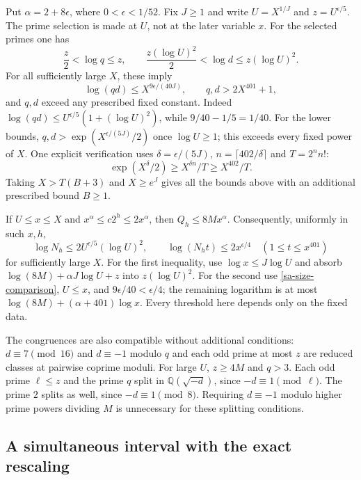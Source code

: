 Put $\alpha=2+8\epsilon$, where $0<\epsilon<1/52$.
Fix $J\ge1$ and write $U=X^{1/J}$ and $z=U^{\epsilon/5}$.
The prime selection is made at $U$, not at the later variable $x$.
For the selected primes one has
\begin{equation}\label{sa-prime-ranges}
 \frac z2<\log q\le z,\qquad
 \frac{z(\log U)^2}{2}<\log d\le z(\log U)^2.
\end{equation}
For all sufficiently large $X$, these imply
\begin{equation}\label{sa-size-comparison}
 \log(qd)\le X^{9\epsilon/(40J)},\qquad
 q,d>2X^{401}+1,
\end{equation}
and $q,d$ exceed any prescribed fixed constant.
Indeed $\log(qd)\le U^{\epsilon/5}(1+(\log U)^2)$, while
$9/40-1/5=1/40$. For the lower bounds,
$q,d>\exp(X^{\epsilon/(5J)}/2)$ once $\log U\ge1$;
this exceeds every fixed power of $X$.
One explicit verification uses
$\delta=\epsilon/(5J)$,
$n=\lceil402/\delta\rceil$ and $T=2^nn!$:
\[
 \exp(X^\delta/2)\ge X^{\delta n}/T\ge X^{402}/T.
\]
Taking $X>T(B+3)$ and $X\ge e^J$ gives all the bounds above
with an additional prescribed bound $B\ge1$.

If $U\le x\le X$ and $x^\alpha\le c2^h\le2x^\alpha$,
then $Q_h\le8Mx^\alpha$. Consequently, uniformly in such $x,h$,
\begin{equation}\label{sa-conductor}
 \log N_h\le2U^{\epsilon/5}(\log U)^2,
 \qquad
 \log(N_ht)\le2x^{\epsilon/4}\quad(1\le t\le x^{401})
\end{equation}
for sufficiently large $X$. For the first inequality, use
$\log x\le J\log U$ and absorb
$\log(8M)+\alpha J\log U+z$ into $z(\log U)^2$.
For the second use \eqref{sa-size-comparison}, $U\le x$, and
$9\epsilon/40<\epsilon/4$; the remaining logarithm is at most
$\log(8M)+(\alpha+401)\log x$.
Every threshold here depends only on the fixed data.

The congruences are also compatible without additional conditions:
$d\equiv7\pmod{16}$ and $d\equiv-1$ modulo $q$ and each odd
prime at most $z$ are reduced classes at pairwise coprime moduli.
For large $U$, $z\ge4M$ and $q>3$. Each odd prime $\ell\le z$
and the prime $q$ split in $\mathbb Q(\sqrt{-d})$, since
$-d\equiv1\pmod\ell$. The prime $2$ splits as well, since
$-d\equiv1\pmod8$. Requiring $d\equiv-1$ modulo higher prime
powers dividing $M$ is unnecessary for these splitting conditions.

\subsection{A simultaneous interval with the exact rescaling}

